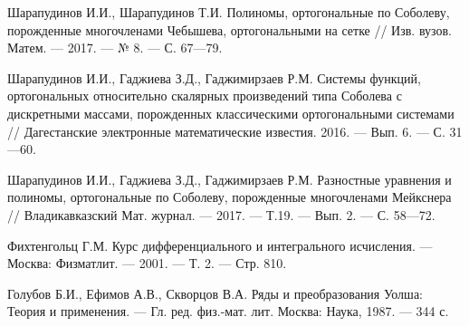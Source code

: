 \begin{thebibliography}{99}









Шарапудинов И.И., Шарапудинов Т.И. Полиномы, ортогональные по Соболеву, порожденные многочленами Чебышева, ортогональными на сетке // Изв. вузов. Матем. --- 2017. --- № 8. --- С. 67---79.











Шарапудинов И.И., Гаджиева З.Д., Гаджимирзаев Р.М. Системы функций, ортогональных относительно скалярных произведений типа Соболева с дискретными массами, порожденных классическими ортогональными системами // Дагестанские электронные математические известия. 2016. --- Вып. 6. --- С. 31---60.











Шарапудинов И.И., Гаджиева З.Д., Гаджимирзаев Р.М.
Разностные уравнения и полиномы, ортогональные по Соболеву, порожденные многочленами Мейкснера //
Владикавказский Мат. журнал. --- 2017. --- Т.19. --- Вып. 2. --- С. 58---72.











Фихтенгольц Г.М.
Курс дифференциального и интегрального исчисления. --- Москва: Физматлит. --- 2001. --- Т. 2. --- Стр. 810.











Голубов Б.И., Ефимов А.В., Скворцов В.А. Ряды и преобразования Уолша: Теория и применения. --- Гл. ред. физ.-мат. лит. Москва: Наука, 1987. --- 344 с.











\end{thebibliography}
